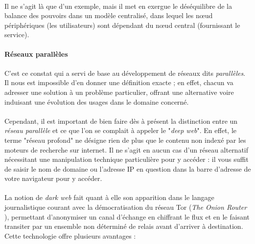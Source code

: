 \paragraph{} Il ne s'agit là que d'un exemple, mais il met en exergue le déséquilibre de la balance des pouvoirs dans un 
modèle centralisé, dans lequel les n\oe{}ud périphériques (les utilisateurs) sont dépendant du n\oe{}ud central (fournissant
le service).


\paragraph{Réseaux parallèles}

\paragraph{} C'est ce constat qui a servi de base au développement de réseaux dits \emph{parallèles}. Il nous est
impossible d'en donner une définition exacte ; en effet, chacun va adresser une solution à un problème particulier,
offrant une alternative voire induisant une évolution des usages dans le domaine concerné.

\paragraph{} Cependant, il est important de bien faire dès à présent la distinction entre un \emph{réseau parallèle} et 
ce que l'on se complait à appeler le "\emph{deep web}". En effet, le terme "réseau profond" ne
désigne rien de plus que le contenu non indexé par les moteurs de recherche sur internet. Il ne s'agit en aucun cas d'un
réseau alternatif nécessitant une manipulation technique particulière pour y accéder : il vous suffit de saisir le nom de
domaine ou l'adresse IP en question dans la barre d'adresse de votre navigateur pour y accéder.

\paragraph{} La notion de \emph{dark web} fait quant à elle son apparition dans le langage journalistique courant avec la 
démocratisation du réseau Tor (\emph{The Onion Router} \cite{Internet4}), permettant d'anonymiser un canal d'échange en chiffrant
le flux et en le faisant transiter par un ensemble non déterminé de relais avant d'arriver à destination. Cette technologie
offre plusieurs avantages : 

